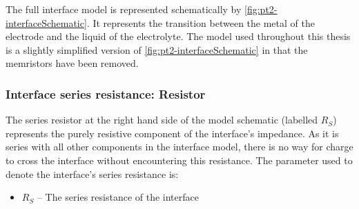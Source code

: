     The full interface model is represented schematically by \cref{fig:pt2-interfaceSchematic}.
    It represents the transition between the metal of the electrode and the liquid of the electrolyte.
    The model used throughout this thesis is a slightly simplified version of \cref{fig:pt2-interfaceSchematic} in that the memristors have been removed.




    \subsubsection{Interface series resistance: Resistor}
      The series resistor at the right hand side of the model schematic (labelled $R_{S}$) represents the purely resistive component of the interface's impedance.
      As it is series with all other components in the interface model, there is no way for charge to cross the interface without encountering this resistance.
      The parameter used to denote the interface's series resistance is:
      \begin{itemize}
        \item $R_S$ -- The series resistance of the interface
      \end{itemize}

